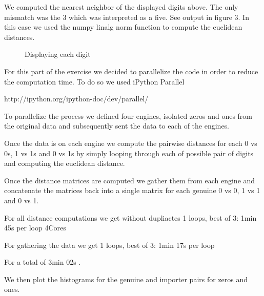\documentclass[12pt]{report}
\begin{document}

We computed the nearest neighbor of the displayed digits above. The only mismatch was the 3 which was interpreted as a five. See output in figure 3. In this case we used the numpy linalg norm function to compute the euclidean distances.

\begin{figure}
\centering
{}
\caption{Displaying each digit}
\end{figure}


For this part of the exercise we decided to parallelize the code in order to reduce the computation time. To do so we used iPython Parallel

http://ipython.org/ipython-doc/dev/parallel/

To parallelize the process we defined four engines, isolated zeros and ones from the original data and subsequently sent the data to each of the engines. 

Once the data is on each engine we compute the pairwise distances for each 0 vs 0s, 1 vs 1s and 0 vs 1s by simply looping through each of possible pair of digits and computing the euclidean distance. 

Once the distance matrices are computed we gather them from each engine and concatenate the matrices back into a single matrix for each genuine 0 vs 0, 1 vs 1 and 0 vs 1.

For all distance computations we get without dupliactes 1 loops, best of 3: 1min 45s per loop 4Cores

For gathering the data we get 1 loops, best of 3: 1min 17s per loop

For a total of 3min 02s .

We then plot the histograms for the genuine and importer pairs for zeros and ones.
\end{document}
